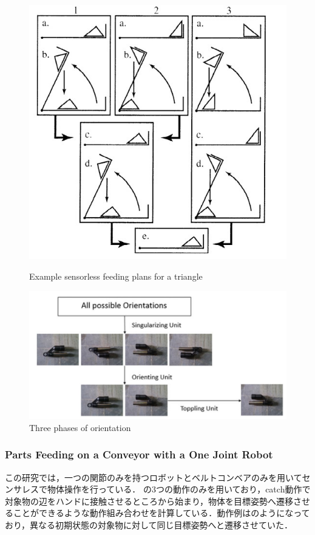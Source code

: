\documentclass[a4paper,twoside,12pt,papersize, dvipdfmx]{iirthesis}
\begin{document}
\begin{figure}[t]
\begin{minipage}{0.5\hsize}
\includegraphics[width=0.9\hsize]{fig/1-introduction/Akella/sensorless_result.jpg}
\caption{Example sensorless feeding plans for a triangle \cite{akella2000}}
\label{fig::sensres}
\end{minipage}

\centering
\includegraphics[width=0.6\hsize]{fig/1-introduction/Udhayakumar/threephase.jpg}
\caption{Three phases of orientation \cite{Udhayakumar}}
\label{fig::three}

\end{figure}
\subsubsection{Parts Feeding on a Conveyor with a One Joint Robot \cite{akella2000}}
この研究では，一つの関節のみを持つロボットとベルトコンベアのみを用いてセンサレスで物体操作を行っている．
の3つの動作のみを用いており，catch動作で対象物の辺をハンドに接触させるところから始まり，物体を目標姿勢へ遷移させることができるような動作組み合わせを計算している．動作例はのようになっており，異なる初期状態の対象物に対して同じ目標姿勢へと遷移させていた．
\end{document}
